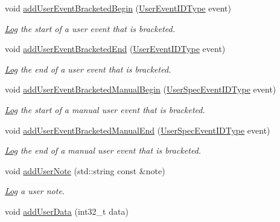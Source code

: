 \begin{DoxyCompactItemize}
void \hyperlink{structvt_1_1trace_1_1_trace_a1264ea508298bfeb6a6ef5e06d9214f9}{add\+User\+Event\+Bracketed\+Begin} (\hyperlink{namespacevt_1_1trace_a5908920d051c144c89f17c69ed262350}{User\+Event\+I\+D\+Type} event)
\begin{DoxyCompactList}\small\item\em \hyperlink{structvt_1_1trace_1_1_log}{Log} the start of a user event that is bracketed. \end{DoxyCompactList}\item 
void \hyperlink{structvt_1_1trace_1_1_trace_a9ed44cd0fb5939013ae30de2aeb8aa0e}{add\+User\+Event\+Bracketed\+End} (\hyperlink{namespacevt_1_1trace_a5908920d051c144c89f17c69ed262350}{User\+Event\+I\+D\+Type} event)
\begin{DoxyCompactList}\small\item\em \hyperlink{structvt_1_1trace_1_1_log}{Log} the end of a user event that is bracketed. \end{DoxyCompactList}\item 
void \hyperlink{structvt_1_1trace_1_1_trace_ab6def24560e35a011beb771b2a05894c}{add\+User\+Event\+Bracketed\+Manual\+Begin} (\hyperlink{namespacevt_1_1trace_a70c43e0e1596eea236912d4197d3120a}{User\+Spec\+Event\+I\+D\+Type} event)
\begin{DoxyCompactList}\small\item\em \hyperlink{structvt_1_1trace_1_1_log}{Log} the start of a manual user event that is bracketed. \end{DoxyCompactList}\item 
void \hyperlink{structvt_1_1trace_1_1_trace_a5de97038ac60bfcdf868c3f32637ef9e}{add\+User\+Event\+Bracketed\+Manual\+End} (\hyperlink{namespacevt_1_1trace_a70c43e0e1596eea236912d4197d3120a}{User\+Spec\+Event\+I\+D\+Type} event)
\begin{DoxyCompactList}\small\item\em \hyperlink{structvt_1_1trace_1_1_log}{Log} the end of a manual user event that is bracketed. \end{DoxyCompactList}\item 
void \hyperlink{structvt_1_1trace_1_1_trace_a8be5309a84a6d0f99df0eb835fedf3b1}{add\+User\+Note} (std\+::string const \&note)
\begin{DoxyCompactList}\small\item\em \hyperlink{structvt_1_1trace_1_1_log}{Log} a user note. \end{DoxyCompactList}\item 
void \hyperlink{structvt_1_1trace_1_1_trace_a7f5ede52aa552c2eac88b894853a2efe}{add\+User\+Data} (int32\+\_\+t data)

\end{DoxyCompactItemize}
